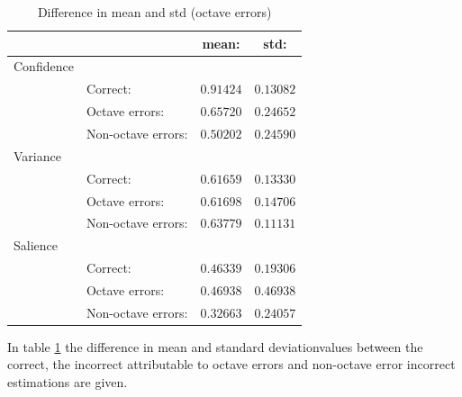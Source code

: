 \documentclass{proc}
\begin{document}
\begin{table}[h]
    \begin{center}
        \begin{tabular}{ | l | l | c | c |}
            \hline
                        &                   &   mean:       &   std:        \\ \hline
            Confidence  &                   &               &               \\  \hline
                        &Correct:           &   $0.91424$   &   $0.13082$   \\  \hline
                        &Octave errors:     &   $0.65720$   &   $0.24652$   \\  \hline
                        &Non-octave errors: &   $0.50202$   &   $0.24590$   \\  \hline
            \hline
            Variance   &                    &               &               \\  \hline
                        &Correct:           &   $0.61659$   &   $0.13330$   \\  \hline
                        &Octave errors:     &   $0.61698$   &   $0.14706$   \\  \hline
                        &Non-octave errors: &   $0.63779$   &   $0.11131$   \\  \hline
 
           Salience   &                     &               &               \\  \hline
                        &Correct:           &   $0.46339$   &   $0.19306$   \\  \hline
                        &Octave errors:     &   $0.46938$   &   $0.46938$   \\  \hline
                        &Non-octave errors: &   $0.32663$   &   $0.24057$   \\  \hline
        \end{tabular}
        \caption{Difference in mean and std (octave errors)}
        \label{table:msdiffOct_cvs}
    \end{center}
\end{table}
In table \ref{table:msdiffOct_cvs} the difference in mean and standard deviationvalues between the correct, the incorrect attributable to octave errors and non-octave error incorrect estimations are given. 
\end{document}
